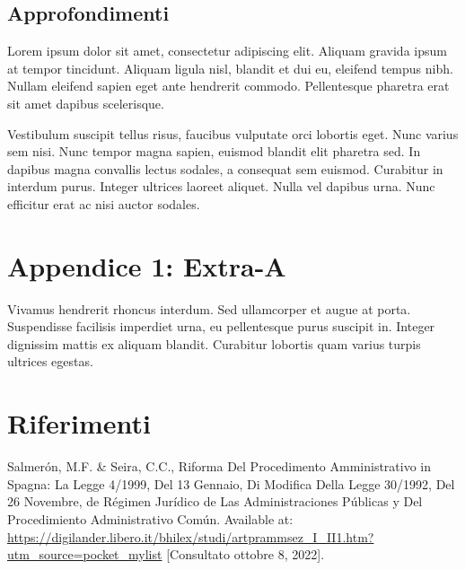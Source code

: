 \documentclass[12pt,it,a4paper,]{report}
\newlength{\cslhangindent}
\newenvironment{CSLReferences}[2] %
 {%
  \setlength{\parindent}{0pt}
  \ifodd #1 \everypar{\setlength{\hangindent}{\cslhangindent}}\ignorespaces\fi
  \ifnum #2 > 0
  \setlength{\parskip}{#2\baselineskip}
  \fi
 }%
 {}
\begin{document}
\hypertarget{approfondimenti}{%
\section{Approfondimenti}\label{approfondimenti}}

Lorem ipsum dolor sit amet, consectetur adipiscing elit. Aliquam gravida
ipsum at tempor tincidunt. Aliquam ligula nisl, blandit et dui eu,
eleifend tempus nibh. Nullam eleifend sapien eget ante hendrerit
commodo. Pellentesque pharetra erat sit amet dapibus scelerisque.

Vestibulum suscipit tellus risus, faucibus vulputate orci lobortis eget.
Nunc varius sem nisi. Nunc tempor magna sapien, euismod blandit elit
pharetra sed. In dapibus magna convallis lectus sodales, a consequat sem
euismod. Curabitur in interdum purus. Integer ultrices laoreet aliquet.
Nulla vel dapibus urna. Nunc efficitur erat ac nisi auctor sodales.

\hypertarget{appendice-1-extra-a}{%
\chapter*{Appendice 1: Extra-A}\label{appendice-1-extra-a}}

Vivamus hendrerit rhoncus interdum. Sed ullamcorper et augue at porta.
Suspendisse facilisis imperdiet urna, eu pellentesque purus suscipit in.
Integer dignissim mattis ex aliquam blandit. Curabitur lobortis quam
varius turpis ultrices egestas.

\footnotesize
\singlespacing
\setlength{\parindent}{0in}

\hypertarget{riferimenti}{%
\chapter*{Riferimenti}\label{riferimenti}}

\hypertarget{refs}{}
\begin{CSLReferences}{1}{0}
\leavevmode{}%
Salmerón, M.F. \& Seira, C.C., Riforma Del Procedimento Amministrativo
in {Spagna}: La {Legge} 4/1999, Del 13 Gennaio, Di Modifica Della
{Legge} 30/1992, Del 26 Novembre, de {Régimen Jurídico} de Las
{Administraciones Públicas} y Del {Procedimiento Administrativo Común}.
Available at:
\url{https://digilander.libero.it/bhilex/studi/artprammsez_I_II1.htm?utm_source=pocket_mylist}
{[}Consultato ottobre 8, 2022{]}.

\end{CSLReferences}
\end{document}
